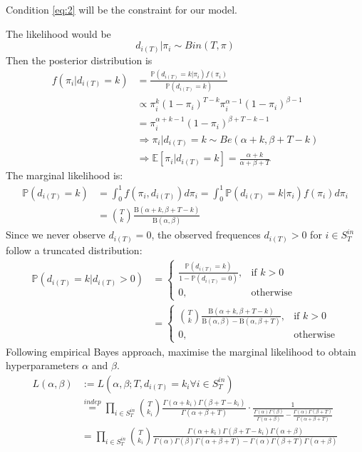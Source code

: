 \documentclass[a4paper, 12pt]{article}
\begin{document}
\noindent Condition \eqref{eq:2} will be the constraint for our model.

\noindent The likelihood would be
\begin{equation*}
    d_{i(T)} |\pi_i \sim Bin(T, \pi)
\end{equation*}
Then the posterior distribution is
\begin{align*}
    f(\pi_i | d_{i(T)} = k) &= \frac{\mathbb{P}(d_{i(T)} = k | \pi_i) f(\pi_i)}{\mathbb{P}(d_{i(T)} = k)} \\
    &\propto \pi_i^k(1 - \pi_i)^{T - k}\pi_i^{\alpha - 1}(1 - \pi_i)^{\beta - 1}\\
    &= \pi_i^{\alpha + k - 1}(1 - \pi_i)^{\beta + T - k - 1}\\
    &\Rightarrow \pi_i | d_{i(T)} = k \sim Be(\alpha + k, \beta + T - k)\\
    &\Rightarrow \mathbb{E}[\pi_i|d_{i(T)} = k] = \frac{\alpha + k}{\alpha + \beta + T}
\end{align*}
The marginal likelihood is:
\begin{align*}
    \mathbb{P}(d_{i(T)} = k) &= \int_0^1 f(\pi_i, d_{i(T)})d\pi_i = \int_0^1 \mathbb{P}(d_{i(T)} = k | \pi_i)f(\pi_i)d\pi_i\\
    &= \binom{T}{k} \frac{\mathrm{B}(\alpha + k, \beta + T - k)}{\mathrm{B}(\alpha, \beta)}
\end{align*}
Since we never observe $d_{i(T)} = 0$, the observed frequences $d_{i(T)} > 0$ for $i \in S_{T}^{in}$ follow a truncated distribution:
\begin{align*}
\mathbb{P}(d_{i(T)} = k | d_{i(T)} > 0) &= 
\begin{cases}
    \frac{\mathbb{P}(d_{i(T)} = k)}{1 - \mathbb{P}(d_{i(T)} = 0)},& \text{if } k > 0 \\
    0, & \text{otherwise}
\end{cases}\\
&=
\begin{cases}
    \binom{T}{k} \frac{\mathrm{B}(\alpha + k, \beta + T - k)}{\mathrm{B}(\alpha, \beta) - \mathrm{B}(\alpha, \beta + T)},& \text{if } k > 0 \\
    0, & \text{otherwise}
\end{cases}
\end{align*}
Following empirical Bayes approach, maximise the marginal likelihood to obtain hyperparameters $\alpha$ and $\beta$.
\begin{align} \label{eq:3}
    L(\alpha, \beta) &:= L(\alpha, \beta; T, d_{i(T)} = k_i \forall i \in S_T^{in}) \nonumber \\
    &\overset{indep}{=} \prod_{i \in S_T^{in}} \binom{T}{k_i} \frac{\Gamma(\alpha + k_i)\Gamma(\beta + T - k_i)}{\Gamma(\alpha + \beta + T)} \cdot \frac{1}{\frac{\Gamma(\alpha)\Gamma(\beta)}{\Gamma(\alpha + \beta)} - \frac{\Gamma(\alpha)\Gamma(\beta + T)}{\Gamma(\alpha + \beta + T)}} \nonumber \\
    &= \prod_{i \in S_T^{in}} \binom{T}{k_i} \frac{\Gamma(\alpha + k_i)\Gamma(\beta + T - k_i)\Gamma(\alpha + \beta)}{\Gamma(\alpha)\Gamma(\beta)\Gamma(\alpha + \beta + T) - \Gamma(\alpha)\Gamma(\beta + T)\Gamma(\alpha + \beta)} \nonumber \\
\end{align}
\end{document}
